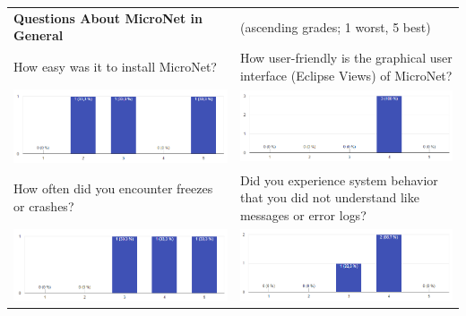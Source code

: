 \begin{center}
  	\hspace*{-1.9cm}
  	\begin{tabular}{ p{8.7cm} p{8.7cm} }
  
    	\textbf{Questions About MicroNet in General} & 
    	(ascending grades; 1 worst, 5 best) \\[1cm]
    	
    	How easy was it to install MicroNet? &
    	How user-friendly is the graphical user interface (Eclipse Views) of
    	MicroNet?\\
    	\includegraphics[width=\linewidth]{images/survey/mn1}
    	&
    	\includegraphics[width=\linewidth]{images/survey/mn2}\\[1cm]
    	
    	How often did you encounter freezes or crashes? &
    	Did you experience system behavior that you did not understand like
    	messages or error logs?\\
    	\includegraphics[width=\linewidth]{images/survey/mn3}
    	&
    	\includegraphics[width=\linewidth]{images/survey/mn4}\\[1cm]
    	

\end{tabular}
\end{center}
